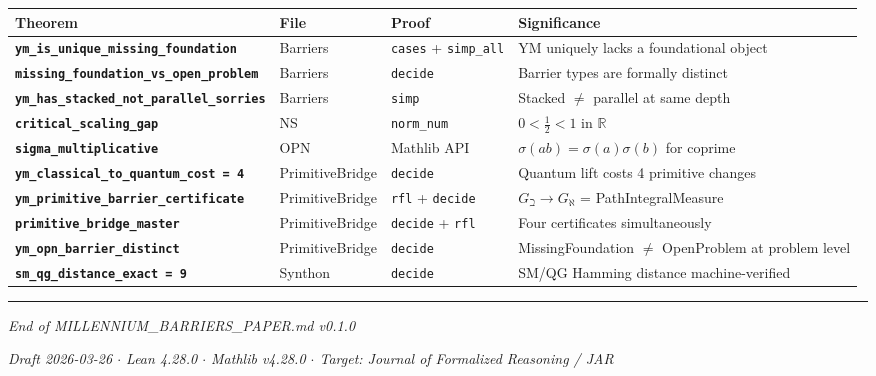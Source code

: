 \documentclass[12pt,a4paper]{article}
\begin{document}
\begin{table}[htbp]
\centering
\small
{}
\begin{tabularx}{\textwidth}{>{\centering\arraybackslash}X >{\centering\arraybackslash}X >{\centering\arraybackslash}X >{\centering\arraybackslash}X}
\toprule
\rowcolor{gray!25}\textbf{Theorem} & \textbf{File} & \textbf{Proof} & \textbf{Significance} \\
\midrule
\rowcolors{1}{white}{gray!10}
\textbf{\texttt{ym\_is\_unique\_missing\_foundation}} & Barriers & \texttt{cases} + \texttt{simp\_all} & YM uniquely lacks a foundational object \\
\textbf{\texttt{missing\_foundation\_vs\_open\_problem}} & Barriers & \texttt{decide} & Barrier types are formally distinct \\
\textbf{\texttt{ym\_has\_stacked\_not\_parallel\_sorries}} & Barriers & \texttt{simp} & Stacked $\neq$ parallel at same depth \\
\textbf{\texttt{critical\_scaling\_gap}} & NS & \texttt{norm\_num} & $0 < \frac{1}{2} < 1$ in $\mathbb{R}$ \\
\textbf{\texttt{sigma\_multiplicative}} & OPN & Mathlib API & $\sigma(ab) = \sigma(a)\sigma(b)$ for coprime \\
\textbf{\texttt{ym\_classical\_to\_quantum\_cost = 4}} & PrimitiveBridge & \texttt{decide} & Quantum lift costs 4 primitive changes \\
\textbf{\texttt{ym\_primitive\_barrier\_certificate}} & PrimitiveBridge & \texttt{rfl} + \texttt{decide} & $G_{\beth} \to G_{\aleph}$ = PathIntegralMeasure \\
\textbf{\texttt{primitive\_bridge\_master}} & PrimitiveBridge & \texttt{decide} + \texttt{rfl} & Four certificates simultaneously \\
\textbf{\texttt{ym\_opn\_barrier\_distinct}} & PrimitiveBridge & \texttt{decide} & MissingFoundation $\neq$ OpenProblem at problem level \\
\textbf{\texttt{sm\_qg\_distance\_exact = 9}} & Synthon & \texttt{decide} & SM/QG Hamming distance machine-verified \\
\bottomrule
\end{tabularx}
\end{table}

\begin{center}
\rule{0.5\textwidth}{0.4pt}
\end{center}

\emph{End of MILLENNIUM\_BARRIERS\_PAPER.md v0.1.0}

\emph{Draft 2026-03-26 $\cdot$ Lean 4.28.0 $\cdot$ Mathlib v4.28.0 $\cdot$ Target: Journal of Formalized Reasoning / JAR}
\end{document}
